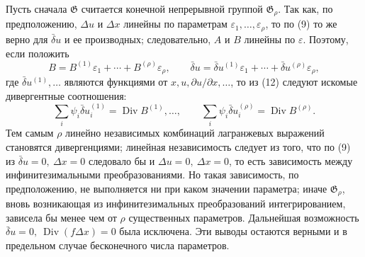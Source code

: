\documentclass[11pt]{article}
\providecommand{\G}{\mathfrak G}
\providecommand{\eps}{\varepsilon}
\providecommand{\D}{\Delta}
\providecommand{\p}{\partial}
\DeclareMathOperator{\Div}{Div}
\providecommand{\bd}{\bar{\delta}}
\begin{document}
Пусть сначала \(\G\) считается конечной непрерывной группой \(\G_\rho\). Так как, по предположению, \(\D u\) и \(\D x\) линейны по параметрам \(\eps_1,\ldots,\eps_\rho\), то по (9) то же верно для \(\bd u\) и ее производных; следовательно, \(A\) и \(B\) линейны по \(\eps\). Поэтому, если положить
\[
B=B^{(1)}\eps_1+\cdots+B^{(\rho)}\eps_\rho,\qquad
\bd u=\bd u^{(1)}\eps_1+\cdots+\bd u^{(\rho)}\eps_\rho,
\]
где \(\bd u^{(1)},\ldots\) являются функциями от \(x,u,\p u/\p x,\ldots\), то из (12) следуют искомые дивергентные соотношения:
\begin{equation}
\sum_i\psi_i\bd u_i^{(1)}=\Div B^{(1)},\ldots,\qquad
\sum_i\psi_i\bd u_i^{(\rho)}=\Div B^{(\rho)}.
\tag{13}
\end{equation}
Тем самым \(\rho\) линейно независимых комбинаций лагранжевых выражений становятся дивергенциями; линейная независимость следует из того, что по (9) из \(\bd u=0,\ \D x=0\) следовало бы и \(\D u=0,\ \D x=0\), то есть зависимость между инфинитезимальными преобразованиями. Но такая зависимость, по предположению, не выполняется ни при каком значении параметра; иначе \(\G_\rho\), вновь возникающая из инфинитезимальных преобразований интегрированием, зависела бы менее чем от \(\rho\) существенных параметров. Дальнейшая возможность \(\bd u=0,\ \Div(f\D x)=0\) была исключена. Эти выводы остаются верными и в предельном случае бесконечного числа параметров.
\end{document}
